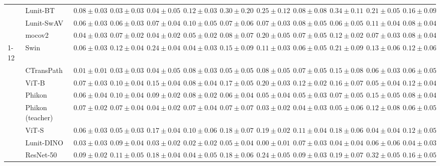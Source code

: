 \begin{tabular}{ll|cccc|c|cccc|c}
 & Lunit-BT & $0.08 \pm 0.03$ & $0.03 \pm 0.03$ & $0.04 \pm 0.05$ & $0.12 \pm 0.03$ & $0.30 \pm 0.20$ & $0.25 \pm 0.12$ & $0.08 \pm 0.08$ & $0.34 \pm 0.11$ & $0.21 \pm 0.05$ & $0.16 \pm 0.09$ \\
 & Lunit-SwAV & $0.06 \pm 0.03$ & $0.06 \pm 0.03$ & $0.07 \pm 0.04$ & $0.10 \pm 0.05$ & $0.07 \pm 0.06$ & $0.07 \pm 0.03$ & $0.08 \pm 0.05$ & $0.06 \pm 0.05$ & $0.11 \pm 0.04$ & $0.08 \pm 0.04$ \\
 & mocov2 & $0.04 \pm 0.03$ & $0.07 \pm 0.02$ & $0.04 \pm 0.02$ & $0.05 \pm 0.02$ & $0.08 \pm 0.07$ & $0.20 \pm 0.05$ & $0.07 \pm 0.05$ & $0.12 \pm 0.02$ & $0.07 \pm 0.03$ & $0.08 \pm 0.04$ \\
\cline{1-12}
\multirow[t]{12}{*}{Transformer} & Swin & $0.06 \pm 0.03$ & $0.12 \pm 0.04$ & $0.24 \pm 0.04$ & $0.04 \pm 0.03$ & $0.15 \pm 0.09$ & $0.11 \pm 0.03$ & $0.06 \pm 0.05$ & $0.21 \pm 0.09$ & $0.13 \pm 0.06$ & $0.12 \pm 0.06$ \\
 & CTransPath & $\mathbf{0.01 \pm 0.01}$ & $\mathbf{0.03 \pm 0.03}$ & $0.04 \pm 0.05$ & $0.08 \pm 0.03$ & $0.05 \pm 0.05$ & $0.08 \pm 0.05$ & $0.07 \pm 0.05$ & $0.15 \pm 0.08$ & $0.06 \pm 0.03$ & $0.06 \pm 0.05$ \\
 & ViT-B & $0.07 \pm 0.03$ & $0.10 \pm 0.04$ & $0.15 \pm 0.04$ & $0.08 \pm 0.04$ & $0.17 \pm 0.05$ & $0.20 \pm 0.03$ & $0.12 \pm 0.02$ & $0.16 \pm 0.07$ & $0.05 \pm 0.04$ & $0.12 \pm 0.04$ \\
 & Phikon & $0.06 \pm 0.04$ & $0.10 \pm 0.04$ & $0.09 \pm 0.02$ & $0.08 \pm 0.02$ & $0.06 \pm 0.04$ & $0.05 \pm 0.04$ & $0.05 \pm 0.03$ & $0.07 \pm 0.05$ & $0.15 \pm 0.05$ & $0.08 \pm 0.04$ \\
 & Phikon (teacher) & $0.07 \pm 0.02$ & $0.07 \pm 0.04$ & $0.04 \pm 0.02$ & $0.07 \pm 0.04$ & $0.07 \pm 0.07$ & $0.03 \pm 0.02$ & $0.04 \pm 0.03$ & $0.05 \pm 0.06$ & $0.12 \pm 0.08$ & $0.06 \pm 0.05$ \\
 & ViT-S & $0.06 \pm 0.03$ & $0.05 \pm 0.03$ & $0.17 \pm 0.04$ & $0.10 \pm 0.06$ & $0.18 \pm 0.07$ & $0.19 \pm 0.02$ & $0.11 \pm 0.04$ & $0.18 \pm 0.06$ & $\mathbf{0.04 \pm 0.04}$ & $0.12 \pm 0.05$ \\
 & Lunit-DINO & $0.03 \pm 0.03$ & $0.09 \pm 0.04$ & $0.03 \pm 0.02$ & $\mathbf{0.02 \pm 0.02}$ & $\mathbf{0.05 \pm 0.04}$ & $\mathbf{0.00 \pm 0.01}$ & $0.07 \pm 0.03$ & $\mathbf{0.04 \pm 0.04}$ & $0.06 \pm 0.06$ & $\mathbf{0.04 \pm 0.03}$ \\
 & ResNet-50 & $0.09 \pm 0.02$ & $0.11 \pm 0.05$ & $0.18 \pm 0.04$ & $0.04 \pm 0.05$ & $0.18 \pm 0.06$ & $0.24 \pm 0.05$ & $0.09 \pm 0.03$ & $0.19 \pm 0.07$ & $0.32 \pm 0.05$ & $0.16 \pm 0.05$ \\

\end{tabular}
